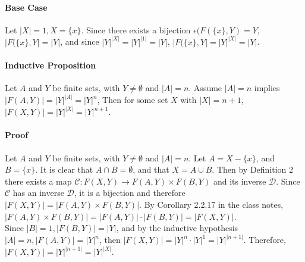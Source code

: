 \documentclass[12pt, letterpaper]{article}
\begin{document}
\paragraph{Base Case} Let \(|X| = 1, X = \{x\}\). Since there exists a bijection \(\epsilon(F(\{x\}, Y) = Y\), \(|F(\{x\}, Y| = |Y|\), and since \(|Y|^{|X|} = |Y|^{|1|}  = |Y|\), \(|F(\{x\}, Y| = |Y|^{|X|} = |Y|\).

\paragraph{Inductive Proposition} Let \(A\) and \(Y\) be finite sets, with \(Y \neq \emptyset\) and \(|A| =n\).  Assume \(|A|= n\) implies \(|F(A, Y)| = |Y|^{|A|} =  |Y|^n\),  Then for some set \(X\) with \(|X| = n +1\), \(|F(X, Y)| = |Y|^{|X|} = |Y|^{n+1}\).

\paragraph{Proof}  Let \(A\) and \(Y\) be finite sets, with \(Y \neq \emptyset\) and \(|A| =n\). Let \(A = X - \{x\}\), and \(B = \{x\}\). It is clear that \(A \cap B = \emptyset\), and that \(X = A \cup B\).  Then by Definition 2 there exists a map \(\mathcal{C}: F(X,Y) \rightarrow F(A,Y) \times F(B,Y)\) and its inverse \(\mathcal{D}\). Since \(\mathcal{C}\) has an inverse \(\mathcal{D}\), it is a bijection and therefore \(|F(X,Y)| = |F(A,Y) \times F(B,Y)|\). By Corollary 2.2.17 in the class notes, \(|F(A,Y) \times F(B,Y)| = |F(A,Y)| \cdot |F(B,Y)| = |F(X,Y)|\). 
\\
Since \(|B| = 1, |F(B, Y)| = |Y|\), and by the inductive hypothesis \(|A| = n, |F(A,Y)| = |Y|^{n}\), then \(|F(X, Y)| = |Y|^n \cdot  |Y|^1 = |Y|^{|n+1|}\). Therefore, \(|F(X, Y)| = |Y|^{|n + 1|} = |Y|^{|X|}\).
 
\end{document}
